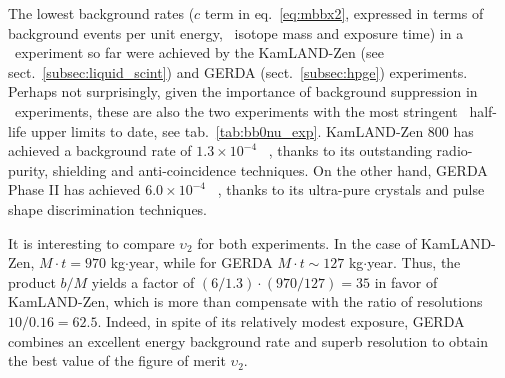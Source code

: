 The lowest background rates ($c$ term in eq.~\ref{eq:mbbx2}, expressed in terms of background events per unit energy, \bb\ isotope mass and exposure time) in a \bbonu\ experiment so far were achieved by the KamLAND-Zen (see sect.~\ref{subsec:liquid_scint}) and GERDA (sect.~\ref{subsec:hpge}) experiments. Perhaps not surprisingly, given the importance of background suppression in \bbonu\ experiments, these are also the two experiments with the most stringent \bbonu\ half-life upper limits to date, see tab.~\ref{tab:bb0nu_exp}. KamLAND-Zen 800 has achieved a background rate of $1.3\times 10^{-4}$ \ckkbby\ \cite{KamLAND-Zen:2022tow}, thanks to its outstanding radio-purity, shielding and anti-coincidence techniques. On the other hand, GERDA Phase II has achieved $6.0\times 10^{-4}$ \ckkbby\ \cite{GERDA:2020xhi}, thanks to its ultra-pure crystals and pulse shape discrimination techniques. 

It is interesting to compare $\upsilon_2$ for both experiments. In the case of KamLAND-Zen, $M\cdot t = 970$ kg$\cdot$year, while for GERDA 
$M\cdot t \sim 127$ kg$\cdot$year. Thus, the product $b/M$ yields a factor of 
$(6/1.3) \cdot (970/127) = 35$ in favor of KamLAND-Zen, which is more than compensate with the ratio of resolutions $10/0.16 = 62.5$. Indeed, in spite of its relatively modest exposure, GERDA combines an excellent energy background rate and superb resolution to obtain the best value of the figure of merit $\upsilon_2$. 




